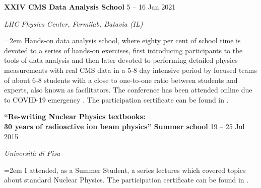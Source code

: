 \documentclass[fontsize=12pt]{article} %
\newcommand{\sepspace}{\vspace*{1em}}		%
\newcommand{\EducationEntry}[4]{
	\noindent \textbf{#1} \hfill      %
	{#2} \par  %
	\noindent \textit{#3} \par        %
	\noindent\hangindent=2em\hangafter=0 \small #4 %
	\normalsize \par}
\begin{document}
    \sepspace
    \EducationEntry{XXIV CMS Data Analysis School}{5 {--} 16 Jan 2021}{LHC Physics Center, Fermilab, Batavia (IL)}{Hands-on data analysis school, where eighty per cent of school time is devoted to a series of hands-on exercises, first introducing participants to the tools of data analysis and then later devoted to performing detailed physics measurements with real CMS data in a 5-8 day intensive period by focused teams of about 6-8 students with a close to one-to-one ratio between students and experts, also known as facilitators. The conference has been attended online due to COVID-19 emergency \cite{cmsdasindico}. The participation certificate can be found in \cite{cmsdas}.}
	\sepspace
    \EducationEntry{``Re-writing Nuclear Physics textbooks: \\ 30 years of radioactive ion beam physics'' Summer school}{19 {--} 25 Jul 2015}{Università di Pisa}
	{I attended, as a Summer Student, a series lectures which covered topics about standard Nuclear Physics. The participation certificate can be found in \cite{summer_school_pisa}.}
\end{document}

